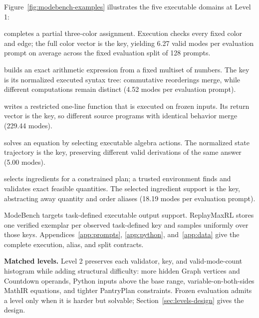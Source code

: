 Figure~\ref{fig:modebench-examples} illustrates the five executable domains at
Level 1:

\begin{list}{\textbullet}{%
  \setlength{\leftmargin}{1.35em}%
  \setlength{\labelwidth}{0.70em}%
  \setlength{\labelsep}{0.35em}%
  \setlength{\itemindent}{0pt}%
  \setlength{\listparindent}{0pt}%
  \setlength{\parsep}{0pt}%
  \setlength{\topsep}{0.3em}%
  \setlength{\itemsep}{0.25em}}
  \item {} completes a partial three-color
  assignment. Execution checks every fixed color and edge; the full color
  vector is the key, yielding 6.27 valid modes per evaluation prompt on
  average across the fixed evaluation split of 128 prompts.

  \item {} builds an exact arithmetic
  expression from a fixed multiset of numbers. The key is its normalized
  executed syntax tree: commutative reorderings merge, while different
  computations remain distinct (4.52 modes per evaluation prompt).

  \item {} writes a restricted one-line
  function that is executed on frozen inputs. Its return vector is the key,
  so different source programs with identical behavior merge (229.44 modes).

  \item {} solves an equation by selecting
  executable algebra actions. The normalized state trajectory is the key,
  preserving different valid derivations of the same answer (5.00 modes).

  \item {} selects ingredients for a constrained
  plan; a trusted environment finds and validates exact feasible quantities.
  The selected ingredient support is the key, abstracting away quantity and
  order aliases (18.19 modes per evaluation prompt).
\end{list}

ModeBench targets task-defined executable output support. ReplayMaxRL stores
one verified exemplar per observed task-defined key and samples uniformly over
those keys.
Appendices~\ref{app:prompts}, \ref{app:python}, and~\ref{app:data} give the
complete execution, alias, and split contracts.

\noindent\textbf{Matched levels.}
Level 2 preserves each validator, key, and valid-mode-count histogram while
adding structural difficulty: more hidden Graph vertices and Countdown
operands, Python inputs above the base range, variable-on-both-sides MathIR
equations, and tighter PantryPlan constraints. Frozen evaluation admits a level only when it is harder but
solvable; Section~\ref{sec:levels-design} gives the design.



